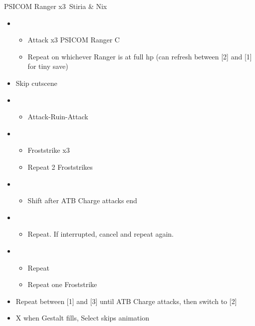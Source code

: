 \begin{paracol}{2}
\switchcolumn
\begin{battle}{PSICOM Ranger x3\, Stiria \& Nix}
\begin{itemize}
    \item \first
    \begin{itemize}
        \item Attack x3 PSICOM Ranger C
        \item Repeat on whichever Ranger is at full hp (can refresh between [2] and [1] for tiny save)
    \end{itemize}
    \item Skip cutscene
    \item \first
    \begin{itemize}
        \item Attack-Ruin-Attack
    \end{itemize}
    \item \third
    \begin{itemize}
        \item Froststrike x3
        \item Repeat 2 Froststrikes
    \end{itemize}
    \item \second
    \begin{itemize}
        \item Shift after ATB Charge attacks end
    \end{itemize}
    \item \first
    \begin{itemize}
        \item Repeat. If interrupted, cancel and repeat again.
    \end{itemize}
    \item \third
    \begin{itemize}
        \item Repeat
        \item Repeat one Froststrike
    \end{itemize}
    \item Repeat between [1] and [3] until ATB Charge attacks, then switch to [2]
    \item X when Gestalt fills, Select skips animation
\end{itemize}
 
\end{battle}
\end{paracol}